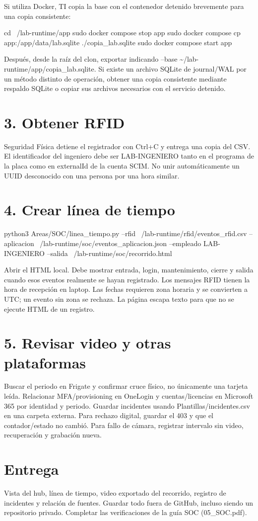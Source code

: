 \documentclass[12pt,a4paper]{article}
\begin{document}
Si utiliza Docker, TI copia la base con el contenedor detenido brevemente para una copia consistente:\par
{}
\begin{Comandos}
cd ~/lab-runtime/app
sudo docker compose stop app
sudo docker compose cp app:/app/data/lab.sqlite ./copia_lab.sqlite
sudo docker compose start app
\end{Comandos}
Después, desde la raíz del clon, exportar indicando \textnormal{--base \textasciitilde{}/\allowbreak{}lab-runtime/\allowbreak{}app/\allowbreak{}copia\_\allowbreak{}lab.sqlite}. Si existe un archivo SQLite de journal/WAL por un método distinto de operación, obtener una copia consistente mediante respaldo SQLite o copiar sus archivos necesarios con el servicio detenido.\par
{}\section*{3. Obtener RFID}
Seguridad Física detiene el registrador con Ctrl+C y entrega una copia del CSV. El identificador del ingeniero debe ser LAB-INGENIERO tanto en el programa de la placa como en externalId de la cuenta SCIM. No unir automáticamente un UUID desconocido con una persona por una hora similar.\par
{}\section*{4. Crear línea de tiempo}
\begin{Comandos}
python3 Areas/SOC/linea_tiempo.py --rfid ~/lab-runtime/rfid/eventos_rfid.csv --aplicacion ~/lab-runtime/soc/eventos_aplicacion.json --empleado LAB-INGENIERO --salida ~/lab-runtime/soc/recorrido.html
\end{Comandos}
Abrir el HTML local. Debe mostrar entrada, login, mantenimiento, cierre y salida cuando esos eventos realmente se hayan registrado. Los mensajes RFID tienen la hora de recepción en laptop. Las fechas requieren zona horaria y se convierten a UTC; un evento sin zona se rechaza. La página escapa texto para que no se ejecute HTML de un registro.\par
{}\section*{5. Revisar video y otras plataformas}
Buscar el periodo en Frigate y confirmar cruce físico, no únicamente una tarjeta leída. Relacionar MFA/provisioning en OneLogin y cuentas/licencias en Microsoft 365 por identidad y periodo. Guardar incidentes usando Plantillas/incidentes.csv en una carpeta externa. Para rechazo digital, guardar el 403 y que el contador/estado no cambió. Para fallo de cámara, registrar intervalo sin video, recuperación y grabación nueva.\par
{}\section*{Entrega}
Vista del hub, línea de tiempo, video exportado del recorrido, registro de incidentes y relación de fuentes. Guardar todo fuera de GitHub, incluso siendo un repositorio privado. Completar las verificaciones de la guía SOC (05\_SOC.pdf).\par
\end{document}
